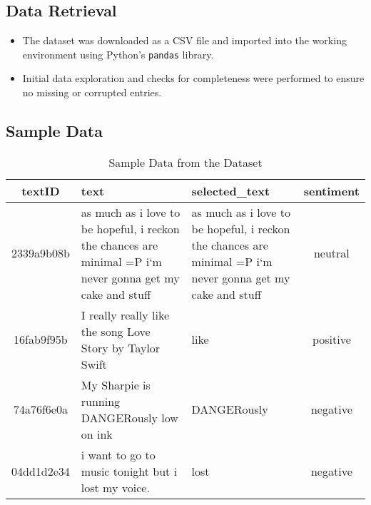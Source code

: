 \documentclass[journal]{IEEEtran}
\begin{document}
\subsection*{Data Retrieval}
\begin{itemize}
    \item The dataset was downloaded as a CSV file and imported into the working environment using Python's \texttt{pandas} library.
    \item Initial data exploration and checks for completeness were performed to ensure no missing or corrupted entries.
\end{itemize}

\subsection*{Sample Data}
\begin{table}[H]
\centering

\begin{tabular}{|c|p{2cm}|p{2.5cm}|c|}
\hline
\textbf{textID} & \textbf{text} & \textbf{selected\_text} & \textbf{sentiment} \\ \hline
2339a9b08b & as much as i love to be hopeful, i reckon the chances are minimal =P i`m never gonna get my cake and stuff & as much as i love to be hopeful, i reckon the chances are minimal =P i`m never gonna get my cake and stuff & neutral \\ \hline
16fab9f95b & I really really like the song Love Story by Taylor Swift & like & positive \\ \hline
74a76f6e0a & My Sharpie is running DANGERously low on ink & DANGERously & negative \\ \hline
04dd1d2e34 & i want to go to music tonight but i lost my voice. & lost & negative \\ \hline

\end{tabular}
\label{tab:sample_data}
\caption{Sample Data from the Dataset}
\end{table}
        
\end{document}
